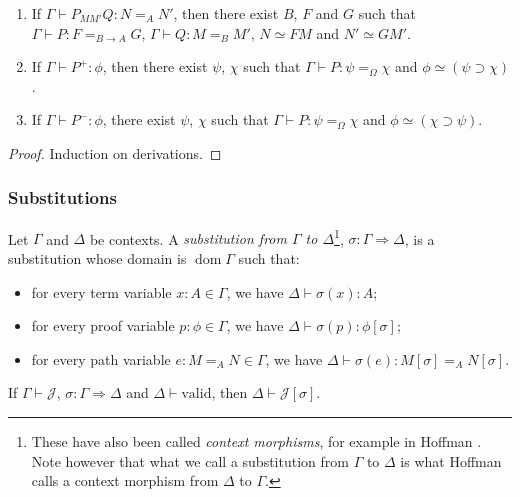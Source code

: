 \documentclass[a4paper,UKenglish]{lipics-v2016}
\newcommand*{\vald}{\ensuremath{\vdash \mathrm{valid}}}
\newcommand*{\dom}{\ensuremath{\operatorname{dom}}}
\theoremstyle{plain}
\begin{document}
\begin{lemma}[Generation]
\begin{enumerate}
\item
If $\Gamma \vdash P_{M M'} Q : N =_A N'$, then there exist $B$, $F$ and $G$ such that $\Gamma \vdash P : F =_{B \rightarrow A} G$, $\Gamma \vdash Q : M =_B M'$, $N \simeq F M$
and $N' \simeq G M'$.
\item
If $\Gamma \vdash P^+ : \phi$, then there exist $\psi$, $\chi$ such that $\Gamma \vdash P : \psi =_\Omega \chi$ and $\phi \simeq (\psi \supset \chi)$.
\item
If $\Gamma \vdash P^- : \phi$, there exist $\psi$, $\chi$ such that $\Gamma \vdash P : \psi =_\Omega \chi$ and $\phi \simeq (\chi \supset \psi)$.
\end{enumerate}
\end{lemma}

\begin{proof}
Induction on derivations.
\end{proof}

\subsubsection{Substitutions}

\begin{definition}
Let $\Gamma$ and $\Delta$ be contexts.  A \emph{substitution from $\Gamma$ to $\Delta$}\footnote{These have also been called \emph{context morphisms}, for example in Hoffman \cite{Hofmann97syntaxand}.  Note however that what we call a substitution from $\Gamma$ to $\Delta$ is what Hoffman calls a context morphism from $\Delta$ to $\Gamma$.}, $\sigma : \Gamma \Rightarrow \Delta$,
is a substitution whose domain is $\dom \Gamma$ such that:
\begin{itemize}
\item
for every term variable $x : A \in \Gamma$, we have $\Delta \vdash \sigma(x) : A$;
\item
for every proof variable $p : \phi \in \Gamma$, we have $\Delta \vdash \sigma(p) : \phi [ \sigma ]$;
\item
for every path variable $e : M =_A N \in \Gamma$, we have $\Delta \vdash \sigma(e) : M [ \sigma ] =_A N [ \sigma ]$.
\end{itemize}
\end{definition}

\begin{lemma}
If $\Gamma \vdash \mathcal{J}$, $\sigma : \Gamma \Rightarrow \Delta$ and $\Delta \vald$, then $\Delta \vdash \mathcal{J} [\sigma]$.
\end{lemma}
\end{document}
